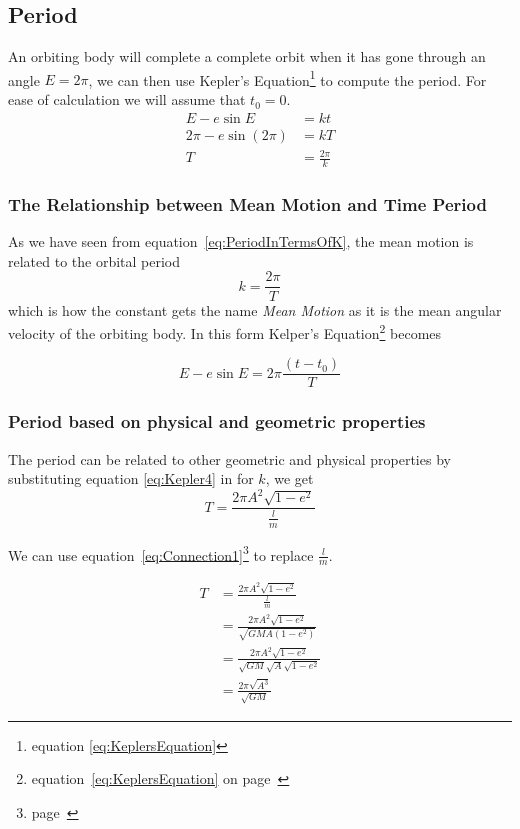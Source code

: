 \subsection{Period}
An orbiting body will complete a complete orbit when it has gone through an angle $E=2\pi$, we can then use Kepler's Equation\footnote{equation \ref{eq:KeplersEquation}} to compute the period. For ease of calculation we will assume that $t_0=0$.
\begin{align}
E-e\sin E &= kt \nonumber\\
2\pi-e\sin(2\pi) &= kT \nonumber \\
T &=\frac{2 \pi}{k} \label{eq:PeriodInTermsOfK}
\end{align}

\subsubsection{The Relationship between Mean Motion and Time Period}
As we have seen from equation~\ref{eq:PeriodInTermsOfK}, the mean motion is related to the orbital period
\begin{equation}
k =\frac{2 \pi}{T} \label{eq:MeanMotionPeriod}
\end{equation}
which is how the constant gets the name \emph{Mean Motion} as it is the mean angular velocity of the orbiting body. In this form Kelper's Equation\footnote{equation~\ref{eq:KeplersEquation} on page~\pageref{eq:KeplersEquation}} becomes

\begin{equation}
E-e\sin E = 2\pi\frac{(t-t_0)}{T} \label{eq:KeplersEquation2}
\end{equation}

\subsubsection{Period based on physical and geometric properties}

The period can be related to other geometric and physical properties by substituting equation \ref{eq:Kepler4} in for $k$, we get
\begin{equation}
T =\frac{2 \pi A^2\sqrt{1-e^2}}{\frac{l}{m}}
\end{equation}

We can use equation~\ref{eq:Connection1}\footnote{page~\pageref{eq:Connection1}} to replace $\frac{l}{m}$.

\begin{align}
T &=\frac{2 \pi A^2\sqrt{1-e^2}}{\frac{l}{m}}\nonumber \\
&=\frac{2 \pi A^2\sqrt{1-e^2}}{\sqrt{GMA(1-e^2)}}\nonumber \\
&= \frac{2 \pi A^2\sqrt{1-e^2}}{\sqrt{GM}\sqrt{A}\sqrt{1-e^2}} \nonumber \\
&= \frac{2 \pi \sqrt{A^3}}{\sqrt{GM}}
\end{align}

